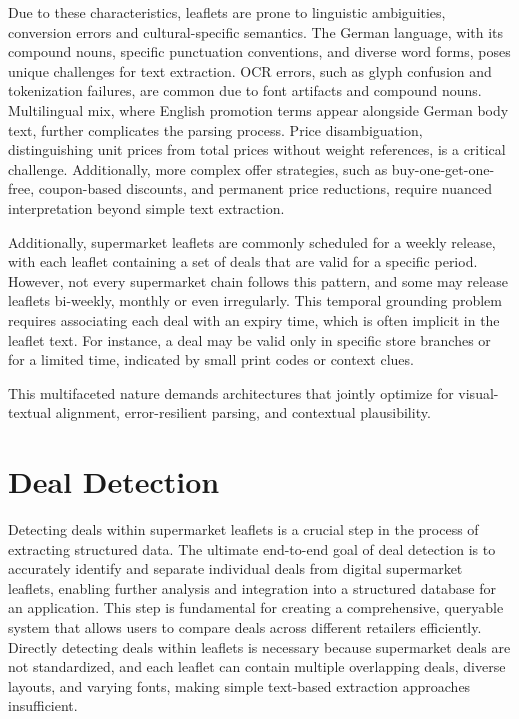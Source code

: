 \documentclass[11pt]{article}
\begin{document}
Due to these characteristics, leaflets are prone to linguistic ambiguities, conversion errors and cultural-specific semantics. The German language, with its compound nouns, specific punctuation conventions, and diverse word forms, poses unique challenges for text extraction. OCR errors, such as glyph confusion and tokenization failures, are common due to font artifacts and compound nouns. Multilingual mix, where English promotion terms appear alongside German body text, further complicates the parsing process. Price disambiguation, distinguishing unit prices from total prices without weight references, is a critical challenge. Additionally, more complex offer strategies, such as buy-one-get-one-free, coupon-based discounts, and permanent price reductions, require nuanced interpretation beyond simple text extraction.

Additionally, supermarket leaflets are commonly scheduled for a weekly release, with each leaflet containing a set of deals that are valid for a specific period. However, not every supermarket chain follows this pattern, and some may release leaflets bi-weekly, monthly or even irregularly. This temporal grounding problem requires associating each deal with an expiry time, which is often implicit in the leaflet text. For instance, a deal may be valid only in specific store branches or for a limited time, indicated by small print codes or context clues.

This multifaceted nature demands architectures that jointly optimize for visual-textual alignment, error-resilient parsing, and contextual plausibility.

\section{Deal Detection}
\label{sec:deal_detection}
Detecting deals within supermarket leaflets is a crucial step in the process of extracting structured data. The ultimate end-to-end goal of deal detection is to accurately identify and separate individual deals from digital supermarket leaflets, enabling further analysis and integration into a structured database for an application. This step is fundamental for creating a comprehensive, queryable system that allows users to compare deals across different retailers efficiently. Directly detecting deals within leaflets is necessary because supermarket deals are not standardized, and each leaflet can contain multiple overlapping deals, diverse layouts, and varying fonts, making simple text-based extraction approaches insufficient.
\end{document}
